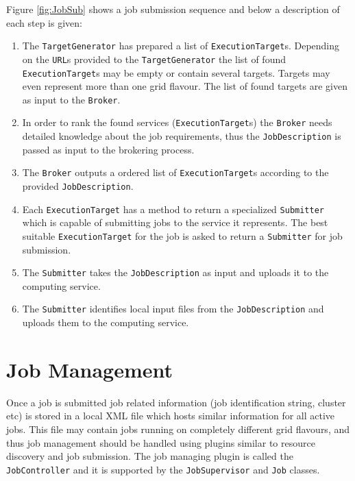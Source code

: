 \documentclass{book}
\newcommand{\Broker}{\texttt{Broker}}
\newcommand{\ExecutionTarget}{\texttt{ExecutionTarget}}
\newcommand{\Job}{\texttt{Job}}
\newcommand{\JobController}{\texttt{JobController}}
\newcommand{\JobDescription}{\texttt{JobDescription}}
\newcommand{\JobSupervisor}{\texttt{JobSupervisor}}
\newcommand{\TargetGenerator}{\texttt{TargetGenerator}}
\newcommand{\Submitter}{\texttt{Submitter}}
\newcommand{\URL}{\texttt{URL}}
\begin{document}
Figure \ref{fig:JobSub} shows a job submission sequence and below a
description of each step is given:

\begin{enumerate}
\item{The {\TargetGenerator} has prepared a list of
  {\ExecutionTarget}s. Depending on the {\URL}s provided to the
  {\TargetGenerator} the list of found {\ExecutionTarget}s may be
  empty or contain several targets. Targets may even represent more
  than one grid flavour. The list of found targets are given as input
  to the {\Broker}.}
\item{In order to rank the found services ({\ExecutionTarget}s) the
  {\Broker} needs detailed knowledge about the job requirements, thus
  the {\JobDescription} is passed as input to the brokering process.}
\item{The {\Broker} outputs a ordered list of {\ExecutionTarget}s
  according to the provided {\JobDescription}.}
\item{Each {\ExecutionTarget} has a method to return a specialized
  {\Submitter} which is capable of submitting jobs to the service it
  represents. The best suitable {\ExecutionTarget} for the job is
  asked to return a {\Submitter} for job submission.}
\item{The {\Submitter} takes the {\JobDescription} as input and
  uploads it to the computing service.}
\item{The {\Submitter} identifies local input files from the
  {\JobDescription} and uploads them to the computing service.}
\end{enumerate}

\section{Job Management}

Once a job is submitted job related information (job identification
string, cluster etc) is stored in a local XML file which hosts similar
information for all active jobs. This file may contain jobs running on
completely different grid flavours, and thus job management should be
handled using plugins similar to resource discovery and job
submission. The job managing plugin is called the {\JobController} and
it is supported by the {\JobSupervisor} and {\Job} classes.
\end{document}
